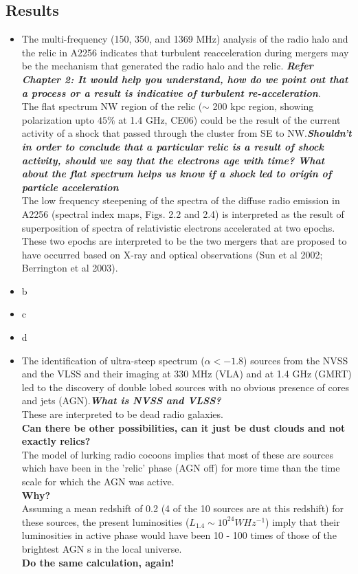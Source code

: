 \documentclass[12pt]{report}
\newcommand{\tit}[1]{\textit{#1}}
\begin{document}
\subsection{Results}
\begin{itemize}

\item The multi-frequency (150, 350, and 1369 MHz) analysis of the radio halo and the relic in A2256 indicates that turbulent reacceleration during mergers may be the mechanism that generated the radio halo and the relic. \textbf{\textit{Refer Chapter 2: It would help you understand, how do we point out that a process or a result is indicative of turbulent re-acceleration}}.\\
The flat spectrum NW region of the relic ($\sim$ 200 kpc region, showing polarization upto $45\%$ at 1.4 GHz, CE06) could be the result of the current activity of a shock that passed through the cluster from SE to NW.\textbf{\tit{Shouldn't in order to conclude that a particular relic is a result of shock activity, should we say that the electrons age with time? What about the flat spectrum helps us know if a shock led to origin of particle acceleration}}\\
 The low frequency steepening of the spectra of the diffuse radio emission in A2256 (spectral index maps, Figs. 2.2 and 2.4) is interpreted as the result of superposition of spectra of relativistic electrons accelerated at two epochs. These two epochs are interpreted to be the two mergers that are proposed to have occurred based on X-ray and optical observations (Sun et al 2002; Berrington et al
2003).

\item b

\item c
\item d
\item  The identification of ultra-steep spectrum ($\alpha < - 1.8$) sources from the NVSS and the VLSS and their imaging at 330 MHz (VLA) and at 1.4 GHz (GMRT) led to the discovery of double lobed sources with no obvious presence of cores and jets (AGN).\textbf{\tit{What is NVSS and VLSS?}}\\
 These are interpreted to be dead radio galaxies.\\
\textbf{Can there be other possibilities, can it just be dust clouds and not exactly relics?}\\ 
  The model of lurking radio cocoons implies that most of these are sources which have been in the 'relic' phase (AGN off) for more time than the time scale for which the AGN was active. \\\textbf{Why?}\\
Assuming a mean redshift of 0.2 (4 of the 10 sources are at this redshift) for these sources, the present luminosities ($L_{1.4} \sim 10^{24}W Hz^{-1}$) imply that their luminosities in active phase would have been 10 - 100 times of those of the brightest AGN s in the local universe.\\
\textbf{Do the same calculation, again!}\\


\end{itemize}
\end{document}
